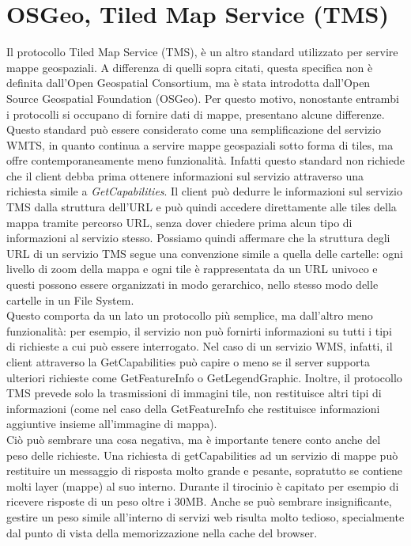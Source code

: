 \section{OSGeo, Tiled Map Service (TMS)}

Il protocollo Tiled Map Service (TMS), è un altro standard utilizzato per servire mappe geospaziali. A differenza di quelli sopra citati, questa specifica non è definita dall'Open Geospatial Consortium, ma è stata introdotta dall'Open Source Geospatial Foundation (OSGeo). Per questo motivo, nonostante entrambi i protocolli si occupano di fornire dati di mappe, presentano alcune differenze.
\\Questo standard può essere considerato come una semplificazione del servizio WMTS, in quanto continua a servire mappe geospaziali sotto forma di tiles, ma offre contemporaneamente meno funzionalità.
Infatti questo standard non richiede che il client debba prima ottenere informazioni sul servizio attraverso una richiesta simile a  \textit{GetCapabilities}. Il client può dedurre le informazioni sul servizio TMS dalla struttura dell'URL e può quindi accedere direttamente alle tiles della mappa tramite percorso URL, senza dover chiedere prima alcun tipo di informazioni al servizio stesso. Possiamo quindi affermare che la struttura degli URL di un servizio TMS segue una convenzione simile a quella delle cartelle: ogni livello di zoom della mappa e ogni tile è rappresentata da un URL univoco e questi possono essere organizzati in modo gerarchico, nello stesso modo delle cartelle in un File System.
\\Questo comporta da un lato un protocollo più semplice, ma dall'altro meno funzionalità: per esempio, il servizio non può fornirti informazioni su tutti i tipi di richieste a cui può essere interrogato. Nel caso di un servizio WMS, infatti, il client attraverso la GetCapabilities può capire o meno se il server supporta ulteriori richieste come GetFeatureInfo o GetLegendGraphic.
Inoltre, il protocollo TMS prevede solo la trasmissioni di immagini tile, non restituisce altri tipi di informazioni (come nel caso della GetFeatureInfo che restituisce informazioni aggiuntive insieme all'immagine di mappa).
\\Ciò può sembrare una cosa negativa, ma è importante tenere conto anche del peso delle richieste. Una richiesta di getCapabilities ad un servizio di mappe può restituire un messaggio di risposta molto grande e pesante, sopratutto se contiene molti layer (mappe) al suo interno. Durante il tirocinio è capitato per esempio di ricevere risposte di un peso oltre i 30MB. Anche se può sembrare insignificante, gestire un peso simile all'interno di servizi web risulta molto tedioso, specialmente dal punto di vista della memorizzazione nella cache del browser.

